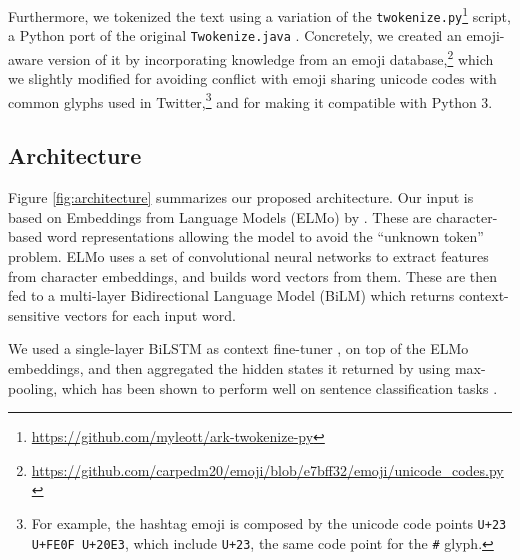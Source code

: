\documentclass[11pt,a4paper]{article}
\begin{document}
    Furthermore, we tokenized the text using a variation of the
    \texttt{twokenize.py}\footnote{\tiny\url{https://github.com/myleott/ark-twokenize-py}}
    script, a Python port of the original \texttt{Twokenize.java}
    \cite{gimpel-EtAl:2011:ACL-HLT2011}. Concretely, we created an emoji-aware
    version of it by incorporating knowledge from an emoji
    database,\footnote{\tiny\url{https://github.com/carpedm20/emoji/blob/e7bff32/emoji/unicode_codes.py}}
    which we slightly modified for avoiding conflict with emoji sharing unicode
    codes with common glyphs used in Twitter,\footnote{For example, the hashtag
    emoji is composed by the unicode code points \texttt{U+23 U+FE0F U+20E3},
which include \texttt{U+23}, the same code point for the \texttt{\#} glyph.} and for making it compatible with Python 3.

\subsection{Architecture}

Figure \ref{fig:architecture} summarizes our proposed architecture. Our input is based on Embeddings from Language Models (ELMo) by \citet{peters2018deep}. These are character-based word representations allowing the model to avoid the ``unknown token'' problem. ELMo uses a set of convolutional neural networks to extract features from character embeddings, and builds word vectors from them. These are then fed to a multi-layer Bidirectional Language Model (BiLM) which returns context-sensitive vectors for each input word. 

We used a single-layer BiLSTM as context fine-tuner \cite{graves2005framewise, graves2013speech}, on top of the ELMo embeddings, and then aggregated the hidden states it returned by using max-pooling, which has been shown to perform well on sentence classification tasks \cite{conneau2017supervised}.
\end{document}
